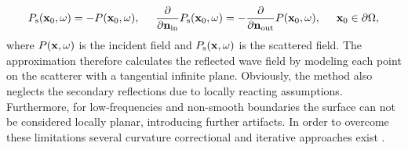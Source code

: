 \begin{itemize}
\begin{equation}
P_{\mathrm{s}}(\mathbf{x}_0,\omega) = -P(\mathbf{x}_0,\omega), \hspace{5mm} \frac{\partial}{\partial \mathbf{n}_{\mathrm{in}}} P_{\mathrm{s}}(\mathbf{x}_0,\omega) = -\frac{\partial}{\partial \mathbf{n}_{\mathrm{out}}} P(\mathbf{x}_0,\omega), \hspace{5mm} \mathbf{x}_0 \in \partial \Omega,
\label{Eq:SFS_theory:tangent_plane}
\end{equation}
where $P(\mathbf{x},\omega)$ is the incident field and $P_{\mathrm{s}}(\mathbf{x},\omega)$ is the scattered field.
The approximation therefore calculates the reflected wave field by modeling each point on the scatterer with a tangential infinite plane. 
Obviously, the method also neglects the secondary reflections due to locally reacting assumptions. Furthermore, for low-frequencies and non-smooth boundaries the surface can not be considered locally planar, introducing further artifacts. 
In order to overcome these limitations several curvature correctional and iterative approaches exist \cite{Elfouhaily2004}.

%
\end{itemize}

